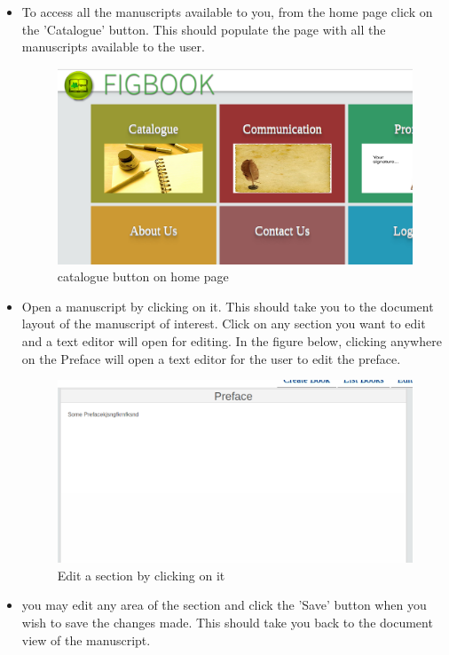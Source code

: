 	\begin{itemize}
		\item To access all the manuscripts available to you, from the home page click on the 'Catalogue' button. This should populate the page with all the manuscripts available to the user. 
		\begin{figure}[h]
			\centering
			\includegraphics[scale=0.3]{images/SelectBook.png}
			\caption{catalogue button on home page}
		\end{figure} 
		
		\newpage
		\item Open a manuscript by clicking on it. This should take you to the document layout of the manuscript of interest. Click on any section you want to edit and a text editor will open for editing. In the figure below, clicking anywhere on the Preface will open a text editor for the user to edit the preface.
		\begin{figure}[h]
			\centering
			\includegraphics[scale=0.3]{images/EditSection.png}
			\caption{Edit a section by clicking on it}
		\end{figure} 
		\item you may edit any area of the section and click the 'Save' button when you wish to save the changes made. This should take you back to the document view of the manuscript.
		

\end{itemize}
